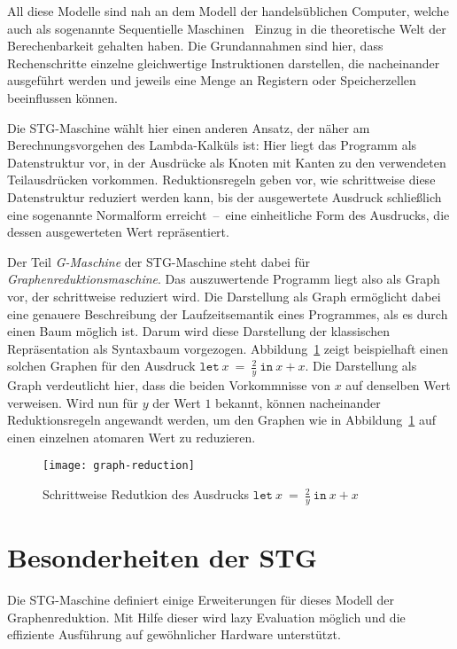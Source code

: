 All diese Modelle sind nah an dem Modell der handelsüblichen Computer, welche auch als sogenannte Sequentielle Maschinen~\cite{Slot_ProblemSpaceInvariance} Einzug in die theoretische Welt der Berechenbarkeit gehalten haben.
Die Grundannahmen sind hier, dass Rechenschritte einzelne gleichwertige Instruktionen darstellen, die nacheinander ausgeführt werden und jeweils eine Menge an Registern oder Speicherzellen beeinflussen können.

Die STG-Maschine wählt hier einen anderen Ansatz, der näher am Berechnungsvorgehen des Lambda-Kalküls ist:
Hier liegt das Programm als Datenstruktur vor, in der Ausdrücke als Knoten mit Kanten zu den verwendeten Teilausdrücken vorkommen.
Reduktionsregeln geben vor, wie schrittweise diese Datenstruktur reduziert werden kann, bis der ausgewertete Ausdruck schließlich eine sogenannte Normalform erreicht~--~eine einheitliche Form des Ausdrucks, die dessen ausgewerteten Wert repräsentiert.

Der Teil \textit{G-Maschine} der STG-Maschine steht dabei für \textit{Graphenreduktionsmaschine}.
Das auszuwertende Programm liegt also als Graph vor, der schrittweise reduziert wird.
Die Darstellung als Graph ermöglicht dabei eine genauere Beschreibung der Laufzeitsemantik eines Programmes, als es durch einen Baum möglich ist.
Darum wird diese Darstellung der klassischen Repräsentation als Syntaxbaum vorgezogen.
Abbildung~\ref{fig:graph-reduction} zeigt beispielhaft einen solchen Graphen für den Ausdruck $\mathtt{let}\ x\ =\ \frac{2}{y}\ \mathtt{in}\ x + x$.
Die Darstellung als Graph verdeutlicht hier, dass die beiden Vorkommnisse von $x$ auf denselben Wert verweisen.
Wird nun für $y$ der Wert $1$ bekannt, können nacheinander Reduktionsregeln angewandt werden, um den Graphen wie in Abbildung~\ref{fig:graph-reduction} auf einen einzelnen atomaren Wert zu reduzieren.

\begin{figure}
  \centering
  \texttt{[image: graph-reduction]}
  \caption[Schrittweise Reduktion eines Ausdrucks]{Schrittweise Redutkion des Ausdrucks $\mathtt{let}\ x\ =\ \frac{2}{y}\ \mathtt{in}\ x + x$}\label{fig:graph-reduction}
\end{figure}


\section{Besonderheiten der STG}

Die STG-Maschine definiert einige Erweiterungen für dieses Modell der Graphenreduktion.
Mit Hilfe dieser wird lazy Evaluation möglich und die effiziente Ausführung auf gewöhnlicher Hardware unterstützt.


